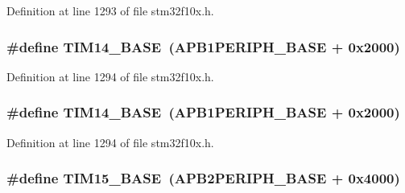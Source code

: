 Definition at line 1293 of file stm32f10x.\+h.

\subsubsection[{\texorpdfstring{T\+I\+M14\+\_\+\+B\+A\+SE}{TIM14_BASE}}]{\setlength{\rightskip}{0pt plus 5cm}\#define T\+I\+M14\+\_\+\+B\+A\+SE~({\bf A\+P\+B1\+P\+E\+R\+I\+P\+H\+\_\+\+B\+A\+SE} + 0x2000)}\hypertarget{group___peripheral__memory__map_ga862855347d6e1d92730dfe17ee8e90b8}{}\label{group___peripheral__memory__map_ga862855347d6e1d92730dfe17ee8e90b8}


Definition at line 1294 of file stm32f10x.\+h.

\subsubsection[{\texorpdfstring{T\+I\+M14\+\_\+\+B\+A\+SE}{TIM14_BASE}}]{\setlength{\rightskip}{0pt plus 5cm}\#define T\+I\+M14\+\_\+\+B\+A\+SE~({\bf A\+P\+B1\+P\+E\+R\+I\+P\+H\+\_\+\+B\+A\+SE} + 0x2000)}\hypertarget{group___peripheral__memory__map_ga862855347d6e1d92730dfe17ee8e90b8}{}\label{group___peripheral__memory__map_ga862855347d6e1d92730dfe17ee8e90b8}


Definition at line 1294 of file stm32f10x.\+h.

\subsubsection[{\texorpdfstring{T\+I\+M15\+\_\+\+B\+A\+SE}{TIM15_BASE}}]{\setlength{\rightskip}{0pt plus 5cm}\#define T\+I\+M15\+\_\+\+B\+A\+SE~({\bf A\+P\+B2\+P\+E\+R\+I\+P\+H\+\_\+\+B\+A\+SE} + 0x4000)}\hypertarget{group___peripheral__memory__map_ga7ab42ce1846930569d742d339b554078}{}\label{group___peripheral__memory__map_ga7ab42ce1846930569d742d339b554078}


